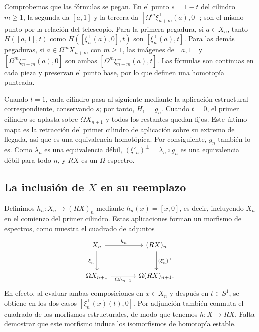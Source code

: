 \begin{center}

\end{center}

Comprobemos que las fórmulas se pegan. En el punto $s=1-t$ del cilindro $m\ge1$, la segunda da $[a,1]$ y la tercera da $[\Omega^m\xi_{n+m}^{\perp}(a),0]$; son el mismo punto por la relación del telescopio. Para la primera pegadura, si $a\in X_n$, tanto $H([a,1],t)$ como $H([\xi_n^{\perp}(a),0],t)$ son $[\xi_n^{\perp}(a),t]$. Para las demás pegaduras, si $a\in\Omega^mX_{n+m}$ con $m\ge1$, las imágenes de $[a,1]$ y $[\Omega^m\xi_{n+m}^{\perp}(a),0]$ son ambas $[\Omega^m\xi_{n+m}^{\perp}(a),t]$. Las fórmulas son continuas en cada pieza y preservan el punto base, por lo que definen una homotopía punteada.

Cuando $t=1$, cada cilindro pasa al siguiente mediante la aplicación estructural correspondiente, conservando $s$; por tanto, $H_1=g_n$. Cuando $t=0$, el primer cilindro se aplasta sobre $\Omega X_{n+1}$ y todos los restantes quedan fijos. Este último mapa es la retracción del primer cilindro de aplicación sobre su extremo de llegada, así que es una equivalencia homotópica. Por consiguiente, $g_n$ también lo es. Como $\lambda_n$ es una equivalencia débil, $(\xi'_n)^{\perp}=\lambda_n\circ g_n$ es una equivalencia débil para todo $n$, y $RX$ es un $\Omega$-espectro.

\subsection{La inclusión de \texorpdfstring{$X$}{X} en su reemplazo}

Definimos $h_n\colon X_n\to(RX)_n$ mediante $h_n(x)=[x,0]$, es decir, incluyendo $X_n$ en el comienzo del primer cilindro. Estas aplicaciones forman un morfismo de espectros, como muestra el cuadrado de adjuntos
\[
\begin{tikzcd}[column sep=large,row sep=large]
X_n \arrow[r,"h_n"] \arrow[d,"\xi_n^{\perp}"']
& (RX)_n \arrow[d,"(\xi'_n)^{\perp}"]\\
\Omega X_{n+1} \arrow[r,"\Omega h_{n+1}"'] & \Omega(RX)_{n+1}.
\end{tikzcd}
\]
En efecto, al evaluar ambas composiciones en $x\in X_n$ y después en $t\in S^1$, se obtiene en los dos casos $[\xi_n^{\perp}(x)(t),0]$. Por adjunción también conmuta el cuadrado de los morfismos estructurales, de modo que tenemos $h\colon X\to RX$. Falta demostrar que este morfismo induce los isomorfismos de homotopía estable.


